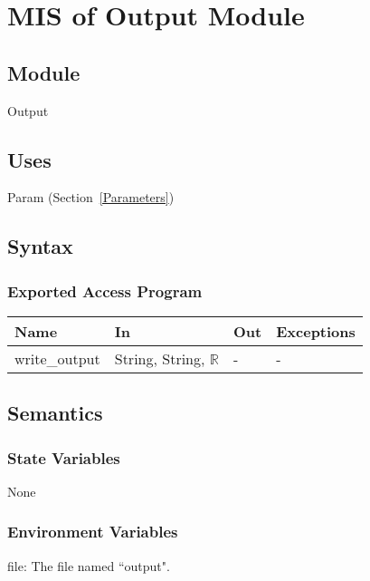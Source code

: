 \documentclass[12pt, titlepage]{article}
\begin{document}
\newpage
\section{MIS of Output Module} \label{Output}

\subsection{Module}

Output

\subsection{Uses}

Param (Section~\ref{Parameters})

\subsection{Syntax}

\subsubsection{Exported Access Program}

\begin{center}
\begin{tabular}{p{3cm} p{7cm} p{2cm} p{2cm}}
\hline
\textbf{Name} & \textbf{In} & \textbf{Out} & \textbf{Exceptions} \\
\hline
write\_output & String, String, $\mathbb{R}$ & - & - \\
\hline
\end{tabular}
\end{center}

\subsection{Semantics}

\subsubsection{State Variables}

None

\subsubsection{Environment Variables}

file: The file named ``output".
\end{document}
